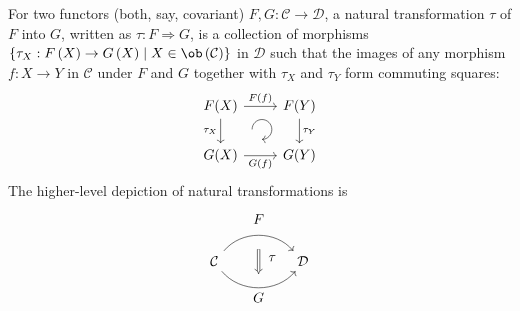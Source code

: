 \begin{defn}
For two functors (both, say, covariant) $F,G:\mathcal{C}\to\mathcal{D}$,
a natural transformation $\tau$ of $F$ into $G$, written as $\tau:F\Longrightarrow G$,
is a collection of morphisms $\left\{ \tau_{X}:F\left(X\right)\to G\left(X\right)\mid X\in\ob\left(\mathcal{C}\right)\right\} $
in $\mathcal{D}$ such that the images of any morphism $f:X\to Y$
in $\mathcal{C}$ under $F$ and $G$ together with $\tau_{X}$ and
$\tau_{Y}$ form commuting squares:
\[\begin{tikzcd}[every matrix/.append style={name=m},   
execute at end picture={\draw [<-] ([xshift=-2.7em,yshift=1mm]m-2-2.north) arc[start angle=-90,delta angle=270,radius=0.25cm];}]
   F(X) \arrow[r,"F(f)"]\arrow[d,swap,"\tau_X"]& F(Y)\arrow[d,"\tau_Y"] \\
   G(X)\arrow[r,swap,"G(f)"]& G(Y)
\end{tikzcd}\]
The higher-level depiction of natural transformations is \[\begin{tikzcd}[column sep=huge]
\mathcal{C}   \arrow[bend left=50]{r}[name=U,label=above:$F$]{}   \arrow[bend right=50]{r}[name=D,label=below:$G$]{} & \mathcal D   \arrow[shorten <=10pt,shorten >=5pt,Rightarrow,to path={(U) -- node[label=right:$\tau$] {} (D)}]{} 
\end{tikzcd}\]
\end{defn}
